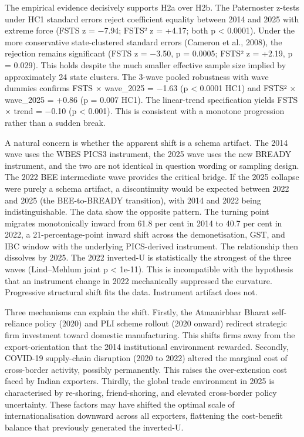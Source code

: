 \documentclass[
  12pt,a4paper]{article}
\begin{document}
The empirical evidence decisively supports H2a over H2b. The Paternoster
z-tests under HC1 standard errors reject coefficient equality between
2014 and 2025 with extreme force (FSTS z = −7.94; FSTS² z = +4.17; both
p \textless{} 0.0001). Under the more conservative state-clustered
standard errors (Cameron et al., 2008), the rejection remains
significant (FSTS z = −3.50, p = 0.0005; FSTS² z = +2.19, p = 0.029).
This holds despite the much smaller effective sample size implied by
approximately 24 state clusters. The 3-wave pooled robustness with wave
dummies confirms FSTS × wave\_2025 = −1.63 (p \textless{} 0.0001 HC1)
and FSTS² × wave\_2025 = +0.86 (p = 0.007 HC1). The linear-trend
specification yields FSTS × trend = −0.10 (p \textless{} 0.001). This is
consistent with a monotone progression rather than a sudden break.

A natural concern is whether the apparent shift is a schema artifact.
The 2014 wave uses the WBES PICS3 instrument, the 2025 wave uses the new
BREADY instrument, and the two are not identical in question wording or
sampling design. The 2022 BEE intermediate wave provides the critical
bridge. If the 2025 collapse were purely a schema artifact, a
discontinuity would be expected between 2022 and 2025 (the BEE-to-BREADY
transition), with 2014 and 2022 being indistinguishable. The data show
the opposite pattern. The turning point migrates monotonically inward
from 61.8 per cent in 2014 to 40.7 per cent in 2022, a
21-percentage-point inward shift across the demonetisation, GST, and IBC
window with the underlying PICS-derived instrument. The relationship
then dissolves by 2025. The 2022 inverted-U is statistically the
strongest of the three waves (Lind--Mehlum joint p \textless{} 1e-11).
This is incompatible with the hypothesis that an instrument change in
2022 mechanically suppressed the curvature. Progressive structural shift
fits the data. Instrument artifact does not.

Three mechanisms can explain the shift. Firstly, the Atmanirbhar Bharat
self-reliance policy (2020) and PLI scheme rollout (2020 onward)
redirect strategic firm investment toward domestic manufacturing. This
shifts firms away from the export-orientation that the 2014
institutional environment rewarded. Secondly, COVID-19 supply-chain
disruption (2020 to 2022) altered the marginal cost of cross-border
activity, possibly permanently. This raises the over-extension cost
faced by Indian exporters. Thirdly, the global trade environment in 2025
is characterised by re-shoring, friend-shoring, and elevated
cross-border policy uncertainty. These factors may have shifted the
optimal scale of internationalisation downward across all exporters,
flattening the cost-benefit balance that previously generated the
inverted-U.
\end{document}
